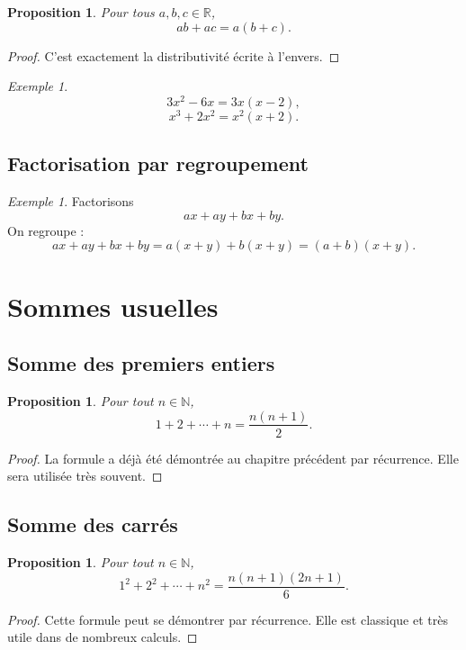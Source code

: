 \documentclass[11pt,a4paper]{article}
\newtheorem{proposition}[definition]{Proposition}
\theoremstyle{remark}
\newtheorem{exemple}[definition]{Exemple}
\newcommand{\R}{\mathbb{R}}
\newcommand{\N}{\mathbb{N}}
\begin{document}
\begin{proposition}
Pour tous \(a,b,c\in\R\),
\[
ab+ac=a(b+c).
\]
\end{proposition}

\begin{proof}
C’est exactement la distributivité écrite à l’envers.
\end{proof}

\begin{exemple}
\[
3x^2-6x=3x(x-2),
\]
\[
x^3+2x^2=x^2(x+2).
\]
\end{exemple}

\subsection{Factorisation par regroupement}

\begin{exemple}
Factorisons
\[
ax+ay+bx+by.
\]
On regroupe :
\[
ax+ay+bx+by=a(x+y)+b(x+y)=(a+b)(x+y).
\]
\end{exemple}

\section{Sommes usuelles}

\subsection{Somme des premiers entiers}

\begin{proposition}
Pour tout \(n\in\N\),
\[
1+2+\cdots+n=\frac{n(n+1)}{2}.
\]
\end{proposition}

\begin{proof}
La formule a déjà été démontrée au chapitre précédent par récurrence. Elle sera utilisée très souvent.
\end{proof}

\subsection{Somme des carrés}

\begin{proposition}
Pour tout \(n\in\N\),
\[
1^2+2^2+\cdots+n^2=\frac{n(n+1)(2n+1)}{6}.
\]
\end{proposition}

\begin{proof}
Cette formule peut se démontrer par récurrence. Elle est classique et très utile dans de nombreux calculs.
\end{proof}
\end{document}
